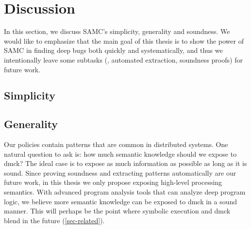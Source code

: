 
\section{Discussion}
\label{discuss}


In this section, we discuss SAMC's simplicity, generality and soundness.
We would like to emphasize that the main goal of this thesis is to show the
power of SAMC in finding deep bugs both quickly and systematically, and
thus we intentionally leave some subtasks (\eg, automated extraction,
soundness proofs) for future work.


\subsection{Simplicity}



\subsection{Generality}
\label{sam-general}

Our policies contain patterns that are common in distributed systems.  One
natural question to ask is: how much semantic knowledge should we expose to
dmck?  The ideal case is to expose as much information as possible as long
as it is sound.  Since proving soundness and extracting patterns
automatically are our future work, in this thesis we only propose exposing
high-level processing semantics.  With advanced program analysis tools that
can analyze deep program logic, we believe more semantic knowledge can be
exposed to dmck in a sound manner.
%
%
This will perhaps be the point where symbolic execution and
dmck blend in the future (\sec\ref{sec-related}).


